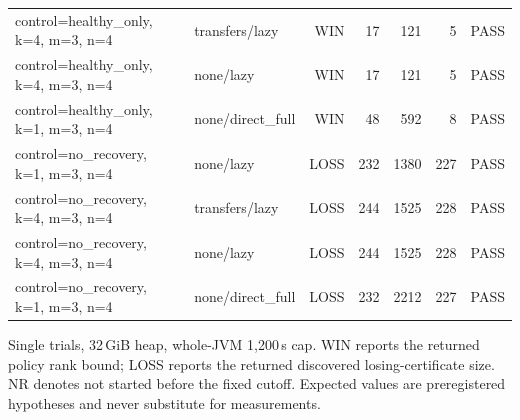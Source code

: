 \begin{longtable}{llrrrrl}
control=healthy\_only, k=4, m=3, n=4 & transfers/lazy & WIN & 17 & 121 & 5 & PASS \\
control=healthy\_only, k=4, m=3, n=4 & none/lazy & WIN & 17 & 121 & 5 & PASS \\
control=healthy\_only, k=1, m=3, n=4 & none/direct\_full & WIN & 48 & 592 & 8 & PASS \\
control=no\_recovery, k=1, m=3, n=4 & none/lazy & LOSS & 232 & 1380 & 227 & PASS \\
control=no\_recovery, k=4, m=3, n=4 & transfers/lazy & LOSS & 244 & 1525 & 228 & PASS \\
control=no\_recovery, k=4, m=3, n=4 & none/lazy & LOSS & 244 & 1525 & 228 & PASS \\
control=no\_recovery, k=1, m=3, n=4 & none/direct\_full & LOSS & 232 & 2212 & 227 & PASS \\
\bottomrule
\end{longtable}
{\par\smallskip\footnotesize Single trials, 32\,GiB heap, whole-JVM 1,200\,s cap. WIN reports the returned policy rank bound; LOSS reports the returned discovered losing-certificate size. NR denotes not started before the fixed cutoff. Expected values are preregistered hypotheses and never substitute for measurements.}
